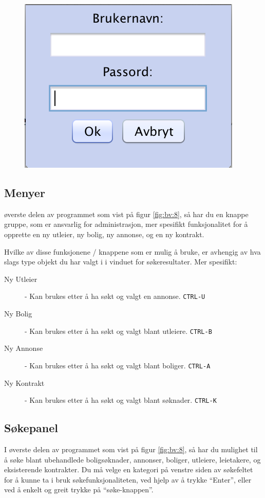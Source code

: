 \begin{figure}[h!]
\center
 \includegraphics[scale=0.7]{./img/brukerveiledning/7.png}
 \caption{}
 \label{fig:bv:7}
\end{figure}




\newpage
\subsection{Menyer}
øverste delen av programmet som vist på figur \ref{fig:bv:8}, så har du en knappe gruppe, som er ansvarlig
for administrasjon, mer spesifikt funksjonalitet for å opprette en ny utleier, ny bolig, ny annonse, og
en ny kontrakt.

Hvilke av disse funksjonene / knappene som er mulig å bruke, er avhengig av hva slags type
objekt du har valgt i i vinduet for søkeresultater. Mer spesifikt:

\begin{description}
\item[Ny Utleier] -
Kan brukes etter å ha søkt og valgt en annonse. \texttt{CTRL-U}
\item[Ny Bolig] -
Kan brukes etter å ha søkt og valgt blant utleiere. \texttt{CTRL-B}
\item[Ny Annonse] -
Kan brukes etter å ha søkt og valgt blant boliger. \texttt{CTRL-A}
\item[Ny Kontrakt] -
Kan brukes etter å ha søkt og valgt blant søknader. \texttt{CTRL-K}
\end{description}





\subsection{Søkepanel}
I øverste delen av programmet som vist på figur \ref{fig:bv:8}, så har du mulighet til å søke blant
ubehandlede boligsøknader, annonser, boliger, utleiere, leietakere, og eksisterende kontrakter.
Du må velge en kategori på venstre siden av søkefeltet for å kunne ta i bruk søkefunksjonaliteten,
ved hjelp av å trykke “Enter”, eller ved å enkelt og greit trykke på “søke-knappen”.



